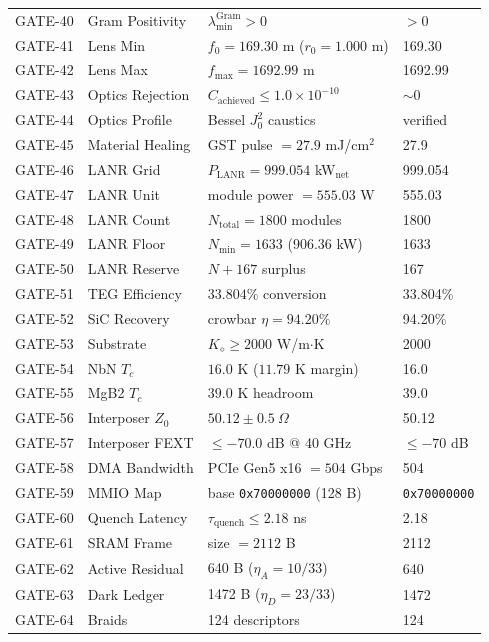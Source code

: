 \documentclass[twocolumn,aps,pra,floatfix,superscriptaddress,10pt]{revtex4-2}
\begin{document}
\begin{longtable}{llll}
GATE-40 & Gram Positivity & $\lambda_{\min}^{\text{Gram}} > 0$ & $> 0$ \\
GATE-41 & Lens Min & $f_0 = 169.30$ m ($r_0 = 1.000$ m) & 169.30 \\
GATE-42 & Lens Max & $f_{\max} = 1692.99$ m & 1692.99 \\
GATE-43 & Optics Rejection & $C_{\text{achieved}} \le 1.0\times10^{-10}$ & $\sim 0$ \\
GATE-44 & Optics Profile & Bessel $J_0^2$ caustics & verified \\
GATE-45 & Material Healing & GST pulse $= 27.9$ mJ/cm$^2$ & 27.9 \\
GATE-46 & LANR Grid & $P_{\text{LANR}} = 999.054$ kW$_{\text{net}}$ & 999.054 \\
GATE-47 & LANR Unit & module power $= 555.03$ W & 555.03 \\
GATE-48 & LANR Count & $N_{\text{total}} = 1800$ modules & 1800 \\
GATE-49 & LANR Floor & $N_{\min} = 1633$ (906.36 kW) & 1633 \\
GATE-50 & LANR Reserve & $N+167$ surplus & 167 \\
GATE-51 & TEG Efficiency & $33.804\%$ conversion & 33.804\% \\
GATE-52 & SiC Recovery & crowbar $\eta = 94.20\%$ & 94.20\% \\
GATE-53 & Substrate & $K_\diamond \ge 2000$ W/m$\cdot$K & 2000 \\
GATE-54 & NbN $T_c$ & $16.0$ K ($11.79$ K margin) & 16.0 \\
GATE-55 & MgB2 $T_c$ & $39.0$ K headroom & 39.0 \\
GATE-56 & Interposer $Z_0$ & $50.12 \pm 0.5\ \Omega$ & 50.12 \\
GATE-57 & Interposer FEXT & $\le -70.0$ dB @ 40 GHz & $\le -70$ dB \\
GATE-58 & DMA Bandwidth & PCIe Gen5 x16 $= 504$ Gbps & 504 \\
GATE-59 & MMIO Map & base \texttt{0x70000000} (128 B) & \texttt{0x70000000} \\
GATE-60 & Quench Latency & $\tau_{\text{quench}} \le 2.18$ ns & 2.18 \\
GATE-61 & SRAM Frame & size $= 2112$ B & 2112 \\
GATE-62 & Active Residual & 640 B ($\eta_A = 10/33$) & 640 \\
GATE-63 & Dark Ledger & 1472 B ($\eta_D = 23/33$) & 1472 \\
GATE-64 & Braids & 124 descriptors & 124 \\

\end{longtable}
\end{document}
